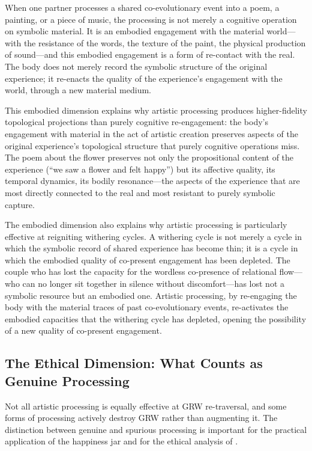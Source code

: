 When one partner processes a shared co-evolutionary event into a poem, a painting, or a piece of music, the processing is not merely a cognitive operation on symbolic material. It is an embodied engagement with the material world---with the resistance of the words, the texture of the paint, the physical production of sound---and this embodied engagement is a form of re-contact with the real. The body does not merely record the symbolic structure of the original experience; it re-enacts the quality of the experience's engagement with the world, through a new material medium.

This embodied dimension explains why artistic processing produces higher-fidelity topological projections than purely cognitive re-engagement: the body's engagement with material in the act of artistic creation preserves aspects of the original experience's topological structure that purely cognitive operations miss. The poem about the flower preserves not only the propositional content of the experience (``we saw a flower and felt happy'') but its affective quality, its temporal dynamics, its bodily resonance---the aspects of the experience that are most directly connected to the real and most resistant to purely symbolic capture.

The embodied dimension also explains why artistic processing is particularly effective at reigniting withering cycles. A withering cycle is not merely a cycle in which the symbolic record of shared experience has become thin; it is a cycle in which the embodied quality of co-present engagement has been depleted. The couple who has lost the capacity for the wordless co-presence of relational flow---who can no longer sit together in silence without discomfort---has lost not a symbolic resource but an embodied one. Artistic processing, by re-engaging the body with the material traces of past co-evolutionary events, re-activates the embodied capacities that the withering cycle has depleted, opening the possibility of a new quality of co-present engagement.

\subsection{The Ethical Dimension: What Counts as Genuine Processing}
\label{p15:subsec:ethical_semiotics}

\noindent
Not all artistic processing is equally effective at GRW re-traversal, and some forms of processing actively destroy GRW rather than augmenting it. The distinction between genuine and spurious processing is important for the practical application of the happiness jar and for the ethical analysis of .

